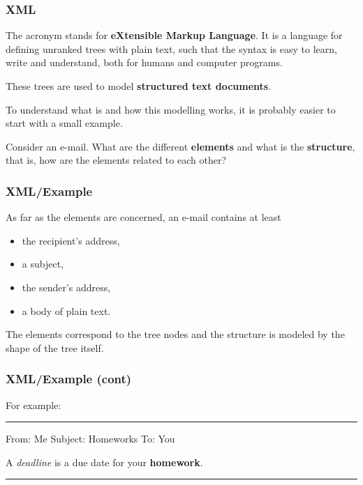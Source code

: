 
%
\begin{frame}
\frametitle{XML}

The acronym \XML stands for \textbf{eXtensible Markup Language}. It is
a language for defining unranked trees with plain text, such that the
syntax is easy to learn, write and understand, both for humans and
computer programs.

\bigskip

These trees are used to model \textbf{structured text documents}.

\bigskip

To understand what \XML is and how this modelling works, it is probably
easier to start with a small example.

\bigskip

Consider an e-mail. What are the different \textbf{elements} and what
is the \textbf{structure}, that is, how are the elements related to
each other?

\end{frame}

%
\begin{frame}
\frametitle{XML/Example}

As far as the elements are concerned, an e-mail contains at least 
\begin{itemize}

  \item the recipient's address,

  \item a subject,

  \item the sender's address,

  \item a body of plain text.

\end{itemize}
The elements correspond to the tree nodes and the structure is modeled
by the shape of the tree itself.

\end{frame}

%
\begin{frame}[containsverbatim]
\frametitle{XML/Example (cont)}

For example:

\bigskip

\noindent\rule{\linewidth}{0.5pt}
\begin{semiverbatim}
From: Me
Subject: Homeworks
To: You

  A \emph{deadline} is a due date for your \textbf{homework}.
\end{semiverbatim}
\rule{\linewidth}{0.5pt}

\end{frame}

